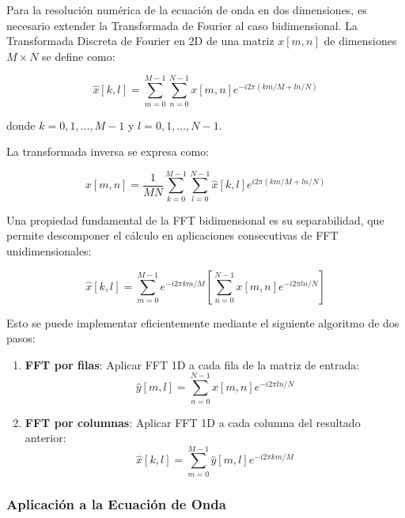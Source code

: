 \documentclass[a4paper]{article}
\begin{document}
Para la resolución numérica de la ecuación de onda en dos dimensiones, es necesario extender la Transformada de Fourier al caso
bidimensional. La Transformada Discreta de Fourier en 2D de una matriz $x[m,n]$ de dimensiones $M \times N$ se define como:

\begin{equation}
    \hat{x}[k,l] = \sum_{m=0}^{M-1} \sum_{n=0}^{N-1} x[m,n] e^{-i2\pi (km/M + ln/N)}
\end{equation}

donde $k = 0, 1, \ldots, M-1$ y $l = 0, 1, \ldots, N-1$.

La transformada inversa se expresa como:

\begin{equation}
    x[m,n] = \frac{1}{MN} \sum_{k=0}^{M-1} \sum_{l=0}^{N-1} \hat{x}[k,l] e^{i2\pi (km/M + ln/N)}
\end{equation}

Una propiedad fundamental de la FFT bidimensional es su separabilidad, que permite descomponer el cálculo en aplicaciones
consecutivas de FFT unidimensionales:

\begin{equation}
    \hat{x}[k,l] = \sum_{m=0}^{M-1} e^{-i2\pi km/M} \left[ \sum_{n=0}^{N-1} x[m,n] e^{-i2\pi ln/N} \right]
\end{equation}

Esto se puede implementar eficientemente mediante el siguiente algoritmo de dos pasos:

\begin{enumerate}
    \item \textbf{FFT por filas}: Aplicar FFT 1D a cada fila de la matriz de entrada:
          \begin{equation}
              \hat{y}[m,l] = \sum_{n=0}^{N-1} x[m,n] e^{-i2\pi ln/N}
          \end{equation}

    \item \textbf{FFT por columnas}: Aplicar FFT 1D a cada columna del resultado anterior:
          \begin{equation}
              \hat{x}[k,l] = \sum_{m=0}^{M-1} \hat{y}[m,l] e^{-i2\pi km/M}
          \end{equation}
\end{enumerate}

\subsubsection{Aplicación a la Ecuación de Onda}
\end{document}
